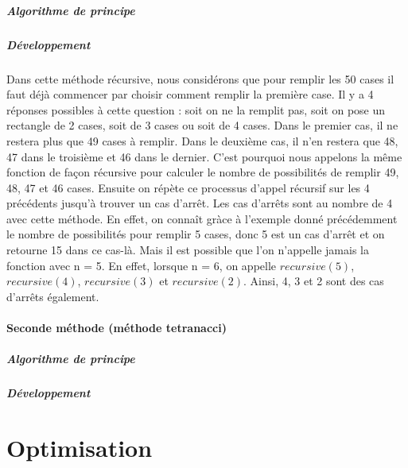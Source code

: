 \documentclass{article}
\begin{document}
\subsubsection{Algorithme de principe}


\subsubsection{Développement}
Dans cette méthode récursive, nous considérons que pour remplir les 50 cases il faut déjà commencer par choisir comment remplir la première case. Il y a 4 réponses possibles à cette question : soit on ne la remplit pas, soit on pose un rectangle de 2 cases, soit de 3 cases ou soit de 4 cases. Dans le premier cas, il ne restera plus que 49 cases à remplir. Dans le deuxième cas, il n'en restera que 48, 47 dans le troisième et 46 dans le dernier. C'est pourquoi nous appelons la même fonction de façon récursive pour calculer le nombre de possibilités de remplir 49, 48, 47 et 46 cases. Ensuite on répète ce processus d'appel récursif sur les 4 précédents jusqu'à trouver un cas d'arrêt. Les cas d'arrêts sont au nombre de 4 avec cette méthode. En effet, on connaît gràce à l'exemple donné précédemment le nombre de possibilités pour remplir 5 cases, donc 5 est un cas d'arrêt et on retourne 15 dans ce cas-là. Mais il est possible que l'on n'appelle jamais la fonction avec n = 5. En effet, lorsque n = 6, on appelle $recursive(5)$, $recursive(4)$, $recursive(3)$ et $recursive(2)$. Ainsi, 4, 3 et 2 sont des cas d'arrêts également.

\subsection{Seconde méthode (méthode tetranacci)}

\subsubsection{Algorithme de principe}


\subsubsection{Développement}



\newpage
\part {Optimisation}
\end{document}
